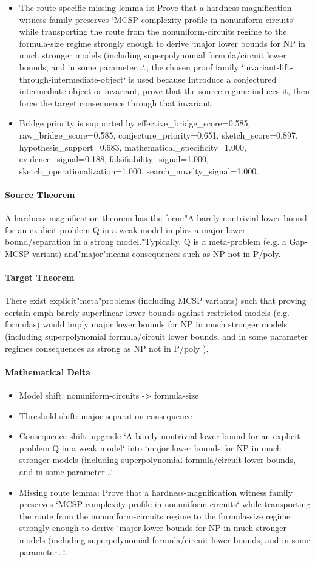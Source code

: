 \documentclass[11pt]{article}
\begin{document}
\begin{itemize}
\item The route-specific missing lemma is: Prove that a hardness-magnification witness family preserves `MCSP complexity profile in nonuniform-circuits` while transporting the route from the nonuniform-circuits regime to the formula-size regime strongly enough to derive `major lower bounds for NP in much stronger models (including superpolynomial formula/circuit lower bounds, and in some parameter...`.; the chosen proof family `invariant-lift-through-intermediate-object` is used because Introduce a conjectured intermediate object or invariant, prove that the source regime induces it, then force the target consequence through that invariant.
\item Bridge priority is supported by effective\_bridge\_score=0.585, raw\_bridge\_score=0.585, conjecture\_priority=0.651, sketch\_score=0.897, hypothesis\_support=0.683, mathematical\_specificity=1.000, evidence\_signal=0.188, falsifiability\_signal=1.000, sketch\_operationalization=1.000, search\_novelty\_signal=1.000.
\end{itemize}
\paragraph{Source Theorem}
A hardness magnification theorem has the form:"A barely-nontrivial lower bound for an explicit problem Q in a weak model implies a major lower bound/separation in a strong model."Typically, Q is a meta-problem (e.g. a Gap-MCSP variant) and"major"means consequences such as NP not in P/poly.
\paragraph{Target Theorem}
There exist explicit"meta"problems (including MCSP variants) such that proving certain emph barely-superlinear lower bounds against restricted models (e.g. formulas) would imply major lower bounds for NP in much stronger models (including superpolynomial formula/circuit lower bounds, and in some parameter regimes consequences as strong as NP not in P/poly ).
\paragraph{Mathematical Delta}
\begin{itemize}
\item Model shift: nonuniform-circuits -> formula-size
\item Threshold shift: major separation consequence
\item Consequence shift: upgrade `A barely-nontrivial lower bound for an explicit problem Q in a weak model` into `major lower bounds for NP in much stronger models (including superpolynomial formula/circuit lower bounds, and in some parameter...`
\item Missing route lemma: Prove that a hardness-magnification witness family preserves `MCSP complexity profile in nonuniform-circuits` while transporting the route from the nonuniform-circuits regime to the formula-size regime strongly enough to derive `major lower bounds for NP in much stronger models (including superpolynomial formula/circuit lower bounds, and in some parameter...`.
\end{itemize}
\end{document}
